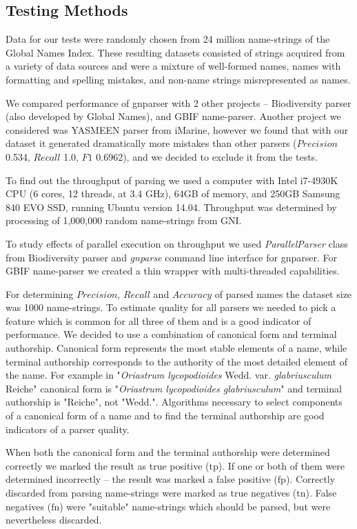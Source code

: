 \documentclass{bmcart}
\begin{document}
\subsection*{Testing Methods}

Data for our tests were randomly chosen from 24 million name-strings of the
Global Names Index. These resulting datasets consisted of strings acquired
from a variety of data sources and were a mixture of well-formed names, names
with formatting and spelling mistakes, and non-name strings misrepresented as
names.

We compared performance of gnparser with 2 other projects -- Biodiversity
parser\cite{biodiversity} (also developed by Global Names), and GBIF
name-parser\cite{gbifNameParser}. Another project we considered was YASMEEN
parser from iMarine\cite{VandenBerghe2015}, however we found that with our
dataset it generated dramatically more mistakes than other parsers
($Precision$ 0.534, $Recall$ 1.0, $F1$ 0.6962), and we decided to exclude it
from the tests.

To find out the throughput of parsing we used a computer with Intel i7-4930K
CPU (6 cores, 12 threads, at 3.4 GHz), 64GB of memory, and 250GB Samsung 840
EVO SSD, running Ubuntu version 14.04. Throughput was determined by processing
of 1,000,000 random name-strings from GNI.

To study effects of parallel execution on throughput we used
\textit{ParallelParser} class from Biodiversity parser and \textit{gnparse}
command line interface for gnparser. For GBIF name-parser we created a thin
wrapper with multi-threaded capabilities\cite{gbifparser}.

For determining $Precision$, $Recall$ and $Accuracy$ of parsed names the
dataset size was 1000 name-strings. To estimate quality for all parsers we
needed to pick a feature which is common for all three of them and is a good
indicator of performance.  We decided to use a combination of canonical form
and terminal authorship.  Canonical form represents the most stable elements
of a name, while terminal authorship corresponds to the authority of the most
detailed element of the name. For example in "\textit{Oriastrum lycopodioides}
Wedd.  var.  \textit{glabriusculum} Reiche" canonical form is
"\textit{Oriastrum lycopodioides glabriusculum}" and terminal authorship is
"Reiche", not "Wedd.".  Algorithms necessary to select components of a
canonical form of a name and to find the terminal authorship are good
indicators of a parser quality.

When both the canonical form and the terminal authorship were determined
correctly we marked the result as true positive ($\text{tp}$).  If one or both
of them were determined incorrectly -- the result was marked a false positive
($\text{fp}$). Correctly discarded from parsing name-strings were marked as
true negatives ($\text{tn}$). False negatives ($\text{fn}$) were "suitable"
name-strings which should be parsed, but were nevertheless discarded.
\end{document}
